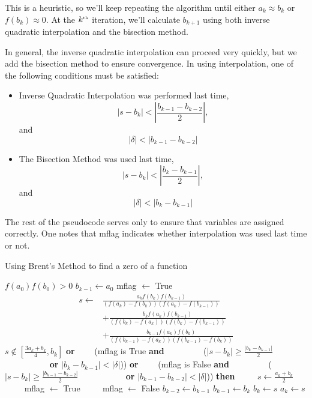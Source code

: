 \documentclass[twocolumn,11pt]{article}
\begin{document}
This is a heuristic, so we'll keep repeating the algorithm until either
$a_k \approx b_k$ or $f(b_k) \approx 0$. At the $k^{\mbox{{\tiny th}}}$ iteration,
we'll calculate $b_{k+1}$ using both inverse quadratic interpolation and the
bisection method.

In general, the inverse quadratic interpolation can proceed very quickly, but we
add the bisection method to ensure convergence. In using interpolation, one of
the following conditions must be satisfied:
\begin{itemize}
\item Inverse Quadratic Interpolation was performed last time,
  \[ |s - b_k| < \left|\frac{b_{k-1}-b_{k-2}}{2}\right|, \]
  and
  \[|\delta| < |b_{k-1} - b_{k-2}| \]
\item The Bisection Method was used last time,
  \[|s - b_k| < \left|\frac{b_k-b_{k-1}}{2}\right|, \]
  and
  \[ |\delta| < |b_k - b_{k-1}| \]
\end{itemize}
The rest of the pseudocode serves only to ensure that variables are assigned
correctly. One notes that mflag indicates whether interpolation was used last
time or not.

\begin{algorithm}
  \caption{Using Brent's Method to find a zero of a function}
  \label{alg:brent}
  \begin{algorithmic}
    \Require $f(a_0)f(b_0) > 0$
      \EndIf
      \State $b_{k-1} \gets a_0$
      \State mflag $\gets$ True
      \begin{align*}
        s \gets &\frac{a_kf(b_k)f(b_{k-1})}{(f(a_k)-f(b_k))(f(a_k)-f(b_{k-1}))} \\
        & + \frac{b_kf(a_k)f(b_{k-1})}{(f(b_k)-f(a_k))(f(b_k)-f(b_{k-1}))} \\
        & + \frac{b_{k-1}f(a_k)f(b_k)}{(f(b_{k-1})-f(a_k))(f(b_{k-1})-f(b_k))}
      \end{align*}
       $\displaystyle s \not \in \left[ \frac{3a_k+b_k}{4},b_k \right]$
             {\bf or}
             \State ~~~~(mflag is True {\bf and}
             \State ~~~~~~~~ ($\displaystyle |s-b_k| \geq \frac{|b_k-b_{k-1}|}{2}$
             \State ~~~~~~~~~~ {\bf or} $|b_k-b_{k-1}| < |\delta|$)) {\bf or}
             \State ~~~~(mflag is False {\bf and}
             \State ~~~~~~~~ ($\displaystyle |s-b_k| \geq \frac{|b_{k-1}-b_{k-2}|}{2}$
             \State ~~~~~~~~~~ {\bf or} $|b_{k-1}-b_{k-2}| < |\delta|$)) {\bf then}
             \State ~~~~ $\displaystyle s \gets \frac{a_k+b_k}{2}$
             \State ~~~~ mflag $\gets$ True
             \State ~~~~ mflag $\gets$ False
        \State $b_{k-2} \gets b_{k-1}$
        \State $b_{k-1} \gets b_k$
          \State $b_k \gets s$
        \Else
          \State $a_k \gets s$
        \EndIf
        \EndIf
      \EndWhile
    \EndFunction
  \end{algorithmic}
\end{algorithm}
\end{document}
